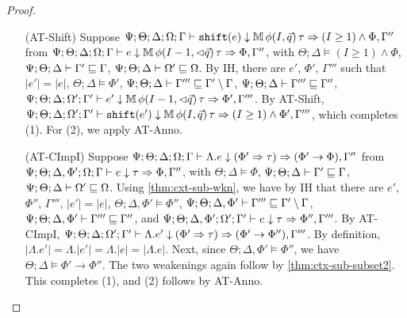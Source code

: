 \begin{proof}
\begin{itemize}
  \item[(AT-Shift)] Suppose $\Psi ; \Theta ; \Delta ; \Omega ; \Gamma \vdash \texttt{shift}(e) \downarrow \mathbb{M} \, \phi(I,\vec{q}) \, \tau \Rightarrow (I \geq 1) \wedge \Phi, \Gamma''$ from
  $\Psi ; \Theta ; \Delta  ; \Omega ; \Gamma \vdash e \downarrow \mathbb{M} \, \phi(I - 1,\lhd \vec{q}) \, \tau \Rightarrow \Phi, \Gamma''$, with
  $\Theta ; \Delta \vDash (I \geq 1) \wedge \Phi$,
  $\Psi ; \Theta ; \Delta \vdash \Gamma' \sqsubseteq \Gamma$,
  $\Psi ; \Theta ; \Delta \vdash \Omega' \sqsubseteq \Omega$.
  By IH, there are $e'$, $\Phi'$, $\Gamma'''$ such that
  $|e'| = |e|$,
  $\Theta ; \Delta \vDash \Phi'$,
  $\Psi ; \Theta ; \Delta \vdash \Gamma''' \sqsubseteq \Gamma' \setminus \Gamma$,
  $\Psi ; \Theta ; \Delta \vdash \Gamma''' \sqsubseteq \Gamma''$,
  $\Psi ; \Theta ; \Delta ; \Omega' ; \Gamma' \vdash e' \downarrow \mathbb{M} \, \phi(I-1,\lhd \vec{q}) \, \tau \Rightarrow \Phi', \Gamma'''$.
  By AT-Shift,
  $\Psi ; \Theta ; \Delta ; \Omega' ; \Gamma' \vdash \texttt{shift}(e') \downarrow \mathbb{M} \, \phi(I,\vec{q}) \, \tau \Rightarrow (I \geq 1) \wedge \Phi', \Gamma'''$,
  which completes (1). For (2), we apply AT-Anno.
  
  \item[(AT-CImpI)] Suppose $\Psi ; \Theta ; \Delta ; \Omega ; \Gamma \vdash \Lambda .e \downarrow (\Phi' \Rightarrow \tau) \Rightarrow (\Phi' \to \Phi),\Gamma''$ from
  $\Psi ; \Theta ; \Delta, \Phi'; \Omega ; \Gamma \vdash e \downarrow \tau \Rightarrow \Phi,\Gamma''$, with
  $\Theta ; \Delta \vDash \Phi$,
  $\Psi ; \Theta ; \Delta \vdash \Gamma' \sqsubseteq \Gamma$,
  $\Psi ; \Theta ; \Delta \vdash \Omega' \sqsubseteq \Omega$.
  Using \autoref{thm:cxt-sub-wkn}, we have by IH that there are $e'$, $\Phi''$, $\Gamma'''$,
  $|e'| = |e|$,
  $\Theta ; \Delta, \Phi' \vDash \Phi''$,
  $\Psi ; \Theta ; \Delta, \Phi' \vdash \Gamma''' \sqsubseteq \Gamma' \setminus \Gamma$,
  $\Psi ; \Theta ; \Delta, \Phi' \vdash \Gamma''' \sqsubseteq \Gamma''$, and
  $\Psi ; \Theta ; \Delta, \Phi' ; \Omega' ; \Gamma' \vdash e \downarrow \tau \Rightarrow \Phi'', \Gamma'''$.
  By AT-CImpI,
  $\Psi ; \Theta ; \Delta ; \Omega' ; \Gamma' \vdash \Lambda .e' \downarrow (\Phi' \Rightarrow \tau) \Rightarrow (\Phi' \to \Phi''),\Gamma'''$.
  By definition, $|\Lambda .e'| = \Lambda.|e'| = \Lambda.|e| = |\Lambda.e|$.
  Next, since $\Theta ; \Delta, \Phi' \vDash \Phi''$, we have $\Theta ; \Delta \vDash \Phi' \to \Phi''$.
  The two weakenings again follow by \autoref{thm:ctx-sub-subset2}.
  This completes (1), and (2) follows by AT-Anno.
  

\end{itemize}
\end{proof}
